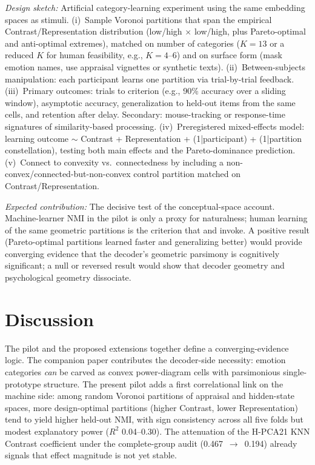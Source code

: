 \documentclass[11pt]{article}
\begin{document}
\emph{Design sketch:} Artificial category-learning experiment using the same embedding spaces as stimuli. (i)~Sample Voronoi partitions that span the empirical Contrast/Representation distribution (low/high $\times$ low/high, plus Pareto-optimal and anti-optimal extremes), matched on number of categories ($K=13$ or a reduced $K$ for human feasibility, e.g., $K=4$--$6$) and on surface form (mask emotion names, use appraisal vignettes or synthetic texts). (ii)~Between-subjects manipulation: each participant learns one partition via trial-by-trial feedback. (iii)~Primary outcomes: trials to criterion (e.g., 90\% accuracy over a sliding window), asymptotic accuracy, generalization to held-out items from the same cells, and retention after delay. Secondary: mouse-tracking or response-time signatures of similarity-based processing. (iv)~Preregistered mixed-effects model: learning outcome $\sim$ Contrast + Representation + (1|participant) + (1|partition constellation), testing both main effects and the Pareto-dominance prediction. (v)~Connect to convexity vs.\ connectedness \citep{douven-verheyen-2026} by including a non-convex/connected-but-non-convex control partition matched on Contrast/Representation.

\emph{Expected contribution:} The decisive test of the conceptual-space account. Machine-learner NMI in the pilot is only a proxy for naturalness; human learning of the same geometric partitions is the criterion that \citet{gardenfors2000conceptual} and \citet{douven-gardenfors-2020} invoke. A positive result (Pareto-optimal partitions learned faster and generalizing better) would provide converging evidence that the decoder's geometric parsimony is cognitively significant; a null or reversed result would show that decoder geometry and psychological geometry dissociate.

\section{Discussion}
\label{sec:discussion}

The pilot and the proposed extensions together define a converging-evidence logic. The companion paper contributes the decoder-side necessity: emotion categories \emph{can} be carved as convex power-diagram cells with parsimonious single-prototype structure. The present pilot adds a first correlational link on the machine side: among random Voronoi partitions of appraisal and hidden-state spaces, more design-optimal partitions (higher Contrast, lower Representation) tend to yield higher held-out NMI, with sign consistency across all five folds but modest explanatory power ($R^2$ 0.04--0.30). The attenuation of the H-PCA21 KNN Contrast coefficient under the complete-group audit (0.467~$\to$~0.194) already signals that effect magnitude is not yet stable.
\end{document}
